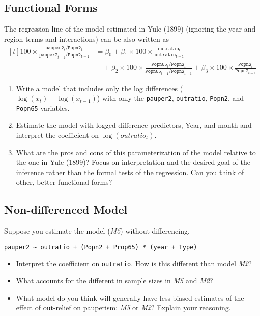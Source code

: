 \documentclass[]{article}
\providecommand{\tightlist}{%
  \setlength{\itemsep}{0pt}\setlength{\parskip}{0pt}}
\begin{document}
\subsection{Functional Forms}\label{functional-forms}

The regression line of the model estimated in Yule (1899) (ignoring the
year and region terms and interactions) can be also written as \[
\begin{aligned}[t]
100 \times \frac{\mathtt{pauper2}_t / \mathtt{Popn2_t}}{\mathtt{pauper2}_{t-1} / \mathtt{Popn2_{t-1}}} 
&= \beta_0 + \beta_1 \times 100 \times \frac{\mathtt{outratio}_t}{\mathtt{outratio_{t-1}}} \\
& \quad + \beta_2 \times 100 \times \frac{\mathtt{Popn65}_t / \mathtt{Popn2}_{t}}{\mathtt{Popn65}_{t-1} / \mathtt{Popn2}_{t-1}} + \beta_3 \times 100 \times \frac{\mathtt{Popn2}_t}{\mathtt{Popn2}_{t - 1}}
\end{aligned}
\]

\begin{enumerate}
\def\labelenumi{\arabic{enumi}.}
\tightlist
\item
  Write a model that includes only the log differences
  (\(\log(x_t) - \log(x_{t - 1})\)) with only the \texttt{pauper2},
  \texttt{outratio}, \texttt{Popn2}, and \texttt{Popn65} variables.
\item
  Estimate the model with logged difference predictors, Year, and month
  and interpret the coefficient on \(\log(outratio_t)\).
\item
  What are the pros and cons of this parameterization of the model
  relative to the one in Yule (1899)? Focus on interpretation and the
  desired goal of the inference rather than the formal tests of the
  regression. Can you think of other, better functional forms?
\end{enumerate}

\subsection{Non-differenced Model}\label{non-differenced-model}

Suppose you estimate the model (\emph{M5}) without differencing,

\begin{verbatim}
pauper2 ~ outratio + (Popn2 + Prop65) * (year + Type)
\end{verbatim}

\begin{itemize}
\tightlist
\item
  Interpret the coefficient on \texttt{outratio}. How is this different
  than model \emph{M2}?
\item
  What accounts for the different in sample sizes in \emph{M5} and
  \emph{M2}?
\item
  What model do you think will generally have less biased estimates of
  the effect of out-relief on pauperism: \emph{M5} or \emph{M2}? Explain
  your reasoning.
\end{itemize}
\end{document}
